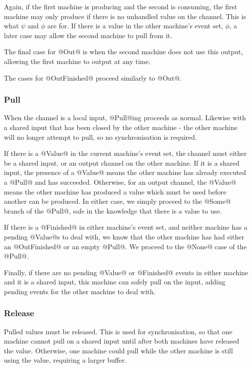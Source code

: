 Again, if the first machine is producing and the second is consuming, the first machine may only produce if there is no unhandled value on the channel.
This is what $\psi$ and $\phi$ are for.
If there is a value in the other machine's event set, $\phi$, a later case may allow the second machine to pull from it.

The final case for @Out@ is when the second machine does not use this output, allowing the first machine to output at any time.

The cases for @OutFinished@ proceed similarly to @Out@.

\subsubsection{Pull}
When the channel is a local input, @Pull@ing proceeds as normal.
Likewise with a shared input that has been closed by the other machine - the other machine will no longer attempt to pull, so no synchronisation is required.

If there is a @Value@ in the current machine's event set, the channel must either be a shared input, or an output channel on the other machine.
If it is a shared input, the presence of a @Value@ means the other machine has already executed a @Pull@ and has succeeded.
Otherwise, for an output channel, the @Value@ means the other machine has produced a value which must be used before another can be produced.
In either case, we simply proceed to the @Some@ branch of the @Pull@, safe in the knowledge that there is a value to use.

If there is a @Finished@ in either machine's event set, and neither machine has a pending @Value@s to deal with, we know that the other machine has had either an @OutFinished@ or an empty @Pull@.
We proceed to the @None@ case of the @Pull@.

Finally, if there are no pending @Value@ or @Finished@ events in either machine and it is a shared input, this machine can safely pull on the input, adding pending events for the other machine to deal with.


\subsubsection{Release}
Pulled values must be released.
This is used for synchronisation, so that one machine cannot pull on a shared input until after both machines have released the value.
Otherwise, one machine could pull while the other machine is still using the value, requiring a larger buffer.

